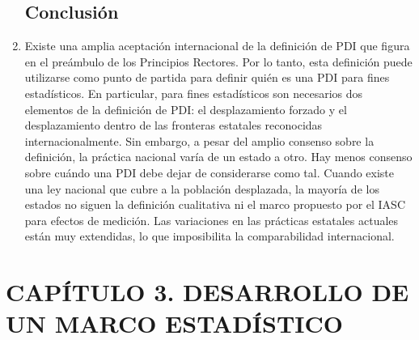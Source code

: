 \documentclass[
]{book}
\begin{document}
\begin{enumerate}
{  \section{Conclusión}\label{conclusiuxf3n}}
\item
  Existe una amplia aceptación internacional de la definición de PDI que figura en el preámbulo de los Principios Rectores. Por lo tanto, esta definición puede utilizarse como punto de partida para definir quién es una PDI para fines estadísticos. En particular, para fines estadísticos son necesarios dos elementos de la definición de PDI: el desplazamiento forzado y el desplazamiento dentro de las fronteras estatales reconocidas internacionalmente. Sin embargo, a pesar del amplio consenso sobre la definición, la práctica nacional varía de un estado a otro. Hay menos consenso sobre cuándo una PDI debe dejar de considerarse como tal. Cuando existe una ley nacional que cubre a la población desplazada, la mayoría de los estados no siguen la definición cualitativa ni el marco propuesto por el IASC para efectos de medición. Las variaciones en las prácticas estatales actuales están muy extendidas, lo que imposibilita la comparabilidad internacional.
\end{enumerate}

\hypertarget{capuxedtulo-3.-desarrollo-de-un-marco-estaduxedstico}{%
\chapter{CAPÍTULO 3. DESARROLLO DE UN MARCO ESTADÍSTICO}\label{capuxedtulo-3.-desarrollo-de-un-marco-estaduxedstico}}
\end{document}

